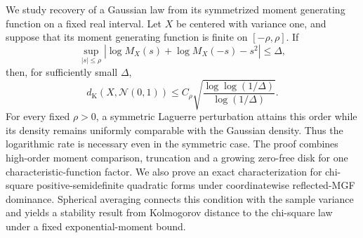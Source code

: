 We study recovery of a Gaussian law from its symmetrized moment generating function on a fixed real interval. Let $X$ be centered with variance one, and suppose that its moment generating function is finite on $[-\rho,\rho]$. If
\[
\sup_{|s|\le\rho}\left|\log M_X(s)+\log M_X(-s)-s^2\right|\le\Delta,
\]
then, for sufficiently small $\Delta$,
\[
d_{\mathrm K}(X,\mathcal N(0,1))
\le C_\rho\sqrt{\frac{\log\log(1/\Delta)}{\log(1/\Delta)}}.
\]
For every fixed $\rho>0$, a symmetric Laguerre perturbation attains this order while its density remains uniformly comparable with the Gaussian density. Thus the logarithmic rate is necessary even in the symmetric case. The proof combines high-order moment comparison, truncation and a growing zero-free disk for one characteristic-function factor. We also prove an exact characterization for chi-square positive-semidefinite quadratic forms under coordinatewise reflected-MGF dominance. Spherical averaging connects this condition with the sample variance and yields a stability result from Kolmogorov distance to the chi-square law under a fixed exponential-moment bound.
